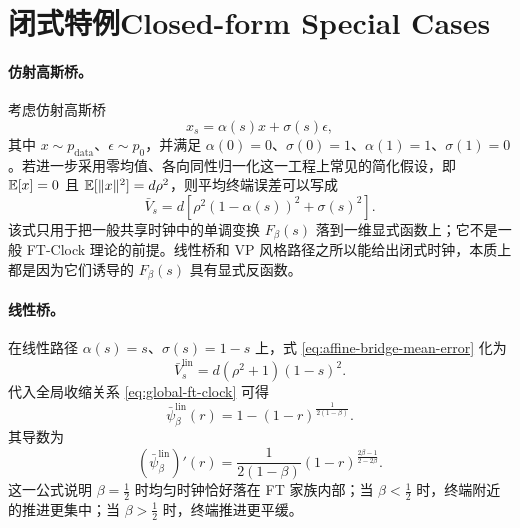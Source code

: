 \section{\ifinternalcn 闭式特例\else Closed-form Special Cases\fi}

\ifinternalcn
\paragraph{仿射高斯桥。}
考虑仿射高斯桥
\begin{equation}
  x_s = \alpha(s)x + \sigma(s)\epsilon,
\end{equation}
其中 $x \sim p_{\mathrm{data}}$、$\epsilon \sim p_0$，并满足 $\alpha(0)=0$、$\sigma(0)=1$、$\alpha(1)=1$、$\sigma(1)=0$。若进一步采用零均值、各向同性归一化这一工程上常见的简化假设，即
\(
  \mathbb{E}[x]=0
\)
且
\(
 \mathbb{E}[\|x\|^2]=d\rho^2
\)，则平均终端误差可以写成
\begin{equation}
  \bar{V}_s = d \left[\rho^2(1-\alpha(s))^2 + \sigma(s)^2\right].
  \label{eq:affine-bridge-mean-error}
\end{equation}
该式只用于把一般共享时钟中的单调变换 $F_{\beta}(s)$ 落到一维显式函数上；它不是一般 FT-Clock 理论的前提。线性桥和 VP 风格路径之所以能给出闭式时钟，本质上都是因为它们诱导的 $F_{\beta}(s)$ 具有显式反函数。

\paragraph{线性桥。}
在线性路径 $\alpha(s)=s$、$\sigma(s)=1-s$ 上，式 \eqref{eq:affine-bridge-mean-error} 化为
\begin{equation}
  \bar{V}^{\mathrm{lin}}_s = d(\rho^2+1)(1-s)^2.
\end{equation}
代入全局收缩关系 \eqref{eq:global-ft-clock} 可得
\begin{equation}
  \bar{\psi}^{\mathrm{lin}}_{\beta}(r)
  =
  1-(1-r)^{\frac{1}{2(1-\beta)}}.
  \label{eq:linear-clock}
\end{equation}
其导数为
\begin{equation}
  (\bar{\psi}^{\mathrm{lin}}_{\beta})'(r)
  =
  \frac{1}{2(1-\beta)}
  (1-r)^{\frac{2\beta-1}{2-2\beta}}.
\end{equation}
这一公式说明 $\beta=\tfrac{1}{2}$ 时均匀时钟恰好落在 FT 家族内部；当 $\beta<\tfrac{1}{2}$ 时，终端附近的推进更集中；当 $\beta>\tfrac{1}{2}$ 时，终端推进更平缓。

